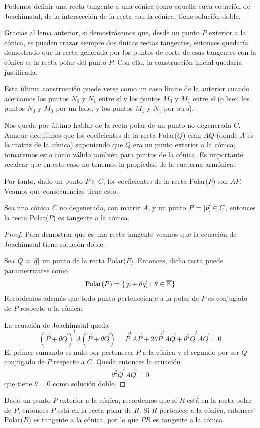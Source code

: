 \begin{obs}
	Podemos definir una recta tangente a una cónica como aquella cuya ecuación de Joachimstal, de la intersección de la recta con la cónica, tiene solución doble.
\end{obs}

Gracias al lema anterior, si demostrásemos que, desde un punto $P$ exterior a la cónica, se pueden trazar siempre dos únicas rectas tangentes, entonces quedaría demostrado que la recta generada por los puntos de corte de esas tangentes con la cónica es la recta polar del punto $P$. Con ello, la construcción inicial quedaría justificada.
\begin{obs}
	Esta última construcción puede verse como un caso límite de la anterior cuando acercamos los puntos $N_0$ y $N_1$ entre sí y los puntos $M_0$ y $M_1$ entre sí (o bien los puntos $N_0$ y $M_0$ por un lado, y los puntos $M_1$ y $N_1$ por otro).
\end{obs}

Nos queda por último hablar de la recta polar de un punto  no degenerada $C$. Aunque dedujimos que los coeficientes de la recta Polar($Q$) eran $AQ$ (donde $A$ es la matriz de la cónica) suponiendo que $Q$ era un punto exterior a la cónica, tomaremos esto como válido también para puntos de la cónica. Es importante recalcar que en este caso no tenemos la propiedad de la cuaterna armónica.

Por tanto, dado un punto $P\in C$, los coeficientes de la recta Polar($P$) son $AP$. Veamos que consecuencias tiene esto.

\begin{lem}
	Sea una cónica $C$ no degenerada, con matriz $A$, y un punto $P=\left [ \vec{p} \right ]\in C$, entonces la recta Polar($P$) es tangente a la cónica.
\end{lem}
\begin{proof}
	Para demostrar que es una recta tangente veamos que la ecuación de Joachimstal tiene solución doble.
	
	Sea $Q=\left [ \vec{q} \right ]$ un punto de la recta Polar($P$). Entonces, dicha recta puede parametrizarse como 
	\[\text{Polar($P$)}=\{\left [ \vec{p}+\theta\vec{q} \right ]\shortparallel\theta\in\overline{\mathbb{K}}\}\]
	Recordemos además que todo punto perteneciente a la polar de $P$ es conjugado de $P$ respecto a la cónica.
	
	La ecuación de Joachimstal queda
	\begin{equation*}
	(\vec{P}+\theta \vec{Q})^tA(\vec{P}+\theta \vec{Q})=\vec{P}^tA\vec{P}+2\theta \vec{P}^tA\vec{Q}+\theta^2\vec{Q}^tA\vec{Q}=0
	\end{equation*}
	El primer sumando es nulo por pertenecer $P$ a la cónica y el segundo por ser $Q$ conjugado de $P$ respecto a $C$. Queda entonces la ecuación
	\[\theta^2\vec{Q}^tA\vec{Q}=0\]
	que tiene $\theta=0$ como solución doble.
\end{proof}
\begin{obs}
	Dado un punto $P$ exterior a la cónica, recordemos que si $R$ está en la recta polar de $P$, entonces $P$ está en la recta polar de $R$. Si $R$ pertenece a la cónica, entonces Polar($R$) es tangente a la cónica, por lo que $PR$ es tangente a la cónica.
\end{obs}

